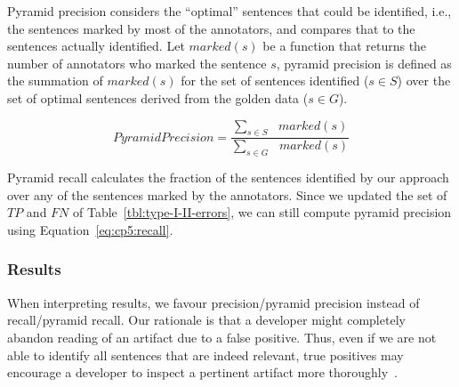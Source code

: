 Pyramid precision considers the ``optimal'' sentences that could be identified, i.e., the sentences marked by most of the annotators, and compares that to the sentences actually identified. Let $marked(s)$ be a function that returns the number of annotators who marked the sentence $s$, pyramid precision is defined as 
the summation of $marked(s)$ for the set of sentences identified ($s \in S$) over the set of optimal sentences derived from the golden data ($s \in G$).



\begin{equation}
\label{eq:cp5:pyramid-precision}    
    Pyramid Precision =  \frac{
        \sum_{s \in S} \text{ } marked(s)
    }{
        \sum_{s \in G} \text{ } marked(s)
    }
\end{equation}






\vspace{2mm}
Pyramid recall calculates the fraction of the sentences identified by our approach over 
any of the sentences marked by the annotators. Since we updated the set of $TP$ and $FN$ of Table~\ref{tbl:type-I-II-errors}, we can still compute pyramid precision using Equation~\ref{eq:cp5:recall}.




\subsubsection{Results}


When interpreting results, we favour precision/pyramid precision instead of recall/pyramid recall.
Our rationale is that a developer might completely abandon reading of an artifact due to a false positive.
Thus, even if we are not able to identify all sentences that are indeed relevant, true positives may encourage a developer to inspect a pertinent artifact more thoroughly~\cite{Singer1998, Brandt2009a}.




